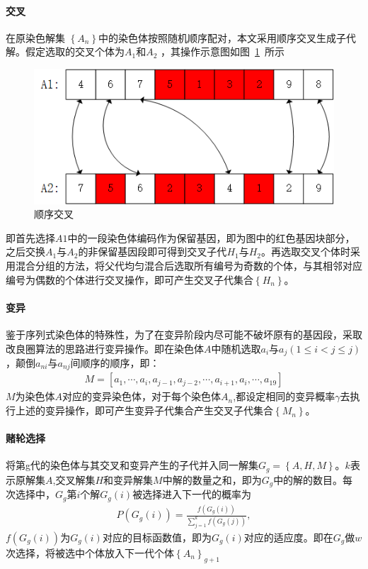 \documentclass{whutmod}
\begin{document}
		\paragraph{交叉}
		在原染色解集 $\left \{ A_n \right \}$中的染色体按照随机顺序配对，本文采用顺序交叉生成子代解。假定选取的交叉个体为$A_1$和$A_2$    ，其操作示意图如图~\ref{gbf}~所示
		\begin{figure}[H]
			\centering
			\includegraphics[width=.75\textwidth]{figures/cross.png}
			\caption{顺序交叉}\label{gbf}
		\end{figure}
		
		即首先选择$A1$中的一段染色体编码作为保留基因，即为图中的红色基因块部分，之后交换$A_1$与$A_2$的非保留基因段即可得到交叉子代$H_1$与$H_2$。再选取交叉个体时采用混合分组的方法，将父代均匀混合后选取所有编号为奇数的个体，与其相邻对应编号为偶数的个体进行交叉操作，即可产生交叉子代集合$\left \{ H_n \right \}$。
	     
		
		
		\paragraph{变异}
		鉴于序列式染色体的特殊性，为了在变异阶段内尽可能不破坏原有的基因段，采取改良圈算法的思路进行变异操作。即在染色体$A$中随机选取$a_{i}$与$a_{j}(1\leqslant i<j\leqslant j )$，颠倒$a_{ni}$与$a_{nj}$间顺序的顺序，即：
		\begin{gather}
		M=[a_{1},\cdots,a_{i},a_{j-1},a_{j-2},\cdots,a_{i+1},a_{i},\cdots,a_{19}]
		\end{gather}
		$M$为染色体$A$对应的变异染色体，对于每个染色体$A_n$,都设定相同的变异概率$\gamma$去执行上述的变异操作，即可产生变异子代集合产生交叉子代集合$\left \{ M_n \right \}$。 
		\paragraph{赌轮选择}
		将第g代的染色体与其交叉和变异产生的子代并入同一解集$G_g=\left \{A,H,M\right \}$。$k$表示原解集$A$,交叉解集$H$和变异解集$M$中解的数量之和，即为$G_g$中的解的数目。每次选择中，$G_g$第$i$个解$G_g(i)$被选择进入下一代的概率为
		\begin{gather}
		P(G_{g}(i))=\frac{f(G_{g}(i))}{\sum_{j=1}^{k}f(G_{g}(j))},
		\end{gather}
		$f(G_{g}(i))$为$G_{g}(i)$对应的目标函数值，即为$G_{g}(i)$对应的适应度。即在$G_g$做$w$次选择，将被选中个体放入下一代个体$\left \{A_n  \right \}_{g+1}$
\end{document}
